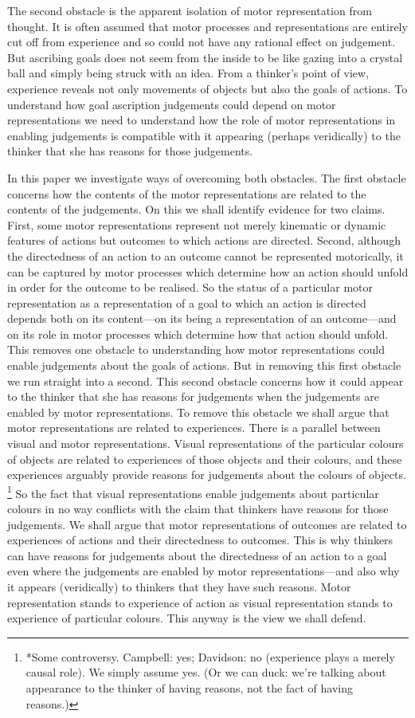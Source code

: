 \documentclass[12pt,\papersize]{extarticle}
\begin{document}
The second obstacle is the apparent isolation of motor representation from thought. It is often assumed that motor processes and representations are entirely cut off from experience and so could not have any rational effect on judgement. But ascribing goals does not seem from the inside to be like gazing into a crystal ball and simply being struck with an idea. From a thinker's point of view, experience reveals not only movements of objects but also the goals of actions. To understand how goal ascription judgements could depend on motor representations we need to understand how the role of motor representations in enabling judgements is compatible with it appearing (perhaps veridically) to the thinker that she has reasons for those judgements.

In this paper we investigate ways of overcoming both obstacles. The first obstacle concerns how the contents of the motor representations are related to the contents of the judgements. On this we shall identify evidence for two claims. First, some motor representations represent not merely kinematic or dynamic features of actions but outcomes to which actions are directed. Second, although the directedness of an action to an outcome cannot be represented motorically, it can be captured by motor processes which determine how an action should unfold in order for the outcome to be realised. So the status of a particular motor representation as a representation of a goal to which an action is directed depends both on its content---on its being a representation of an outcome---and on its role in motor processes which determine how that action should unfold. This removes one obstacle to understanding how motor representations could enable judgements about the goals of actions.  But in removing this first obstacle we run straight into a second.  This second obstacle concerns how it could appear to the thinker that she has reasons for judgements when the judgements are enabled by motor representations. To remove this obstacle we shall argue that motor representations are related to experiences.  There is a parallel between visual and motor representations. Visual representations of the particular colours of objects are related to experiences of those objects and their colours, and these experiences arguably provide reasons for judgements about the colours of objects.%
\footnote{
*Some controversy.  Campbell: yes; Davidson: no (experience plays a merely causal role).  We simply assume yes.  (Or we can duck: we're talking about appearance to the thinker of having reasons, not the fact of having reasons.)}
So the fact that visual representations enable judgements about particular colours in no way conflicts with the claim that thinkers have reasons for those judgements.  We shall argue that motor representations of outcomes are related to experiences of actions and their directedness to outcomes.  This is why thinkers can have reasons for judgements about the directedness of an action to a goal even where the judgements are enabled by motor representations---and also why it appears (veridically) to thinkers that they have such reasons.  Motor representation stands to experience of action as visual representation stands to experience of particular colours. This anyway is the view we shall defend.
\end{document}

